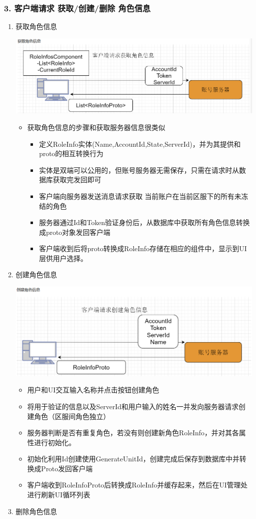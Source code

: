 \documentclass[9pt, b5paper]{article}
\begin{document}
\subsubsection{3. 客户端请求 获取/创建/删除 角色信息}
\label{sec-3-1-3}
\begin{enumerate}
\item 获取角色信息
\label{sec-3-1-3-1}

\includegraphics[width=.9\linewidth]{./pic/readme_20230124_103354.png}
\begin{itemize}
\item 获取角色信息的步骤和获取服务器信息很类似
\begin{itemize}
\item 定义RoleInfo实体(Name,AccountId,State,ServerId)，并为其提供和proto的相互转换行为
\item 实体是双端可以公用的，但账号服务器无需保存，只需在请求时从数据库获取完发回即可
\item 客户端向服务器发送消息请求获取 当前账户在当前区服下的所有未冻结的角色
\item 服务器通过Id和Token验证身份后，从数据库中获取所有角色信息转换成proto对象发回客户端
\item 客户端收到后将proto转换成RoleInfo存储在相应的组件中，显示到UI层供用户选择。
\end{itemize}
\end{itemize}
\item 创建角色信息
\label{sec-3-1-3-2}

\includegraphics[width=.9\linewidth]{./pic/readme_20230124_103625.png}
\begin{itemize}
\item 用户和UI交互输入名称并点击按钮创建角色
\item 将用于验证的信息以及ServerId和用户输入的姓名一并发向服务器请求创建角色（区服间角色独立）
\item 服务器判断是否有重复角色，若没有则创建新角色RoleInfo，并对其各属性进行初始化。
\item 初始化利用Id创建使用GenerateUnitId，创建完成后保存到数据库中并转换成Proto发回客户端
\item 客户端收到RoleInfoProto后转换成RoleInfo并缓存起来，然后在UI管理处进行刷新UI循环列表
\end{itemize}
\item 删除角色信息
\label{sec-3-1-3-3}


\end{enumerate}
\end{document}
